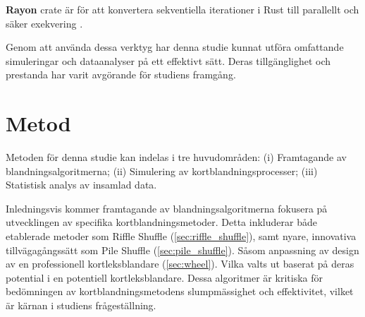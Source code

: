 \documentclass[swedish,a4paper]{article}
\begin{document}
\textbf{Rayon} \gls{crate}  är för att konvertera sekventiella 
iterationer i Rust till parallellt och säker exekvering 
\parencite{rayon_crate}.

Genom att använda dessa verktyg har denna studie kunnat utföra omfattande
simuleringar och dataanalyser på ett effektivt sätt. Deras tillgänglighet och
prestanda har varit avgörande för studiens framgång.




\section{Metod} 
Metoden för denna studie kan indelas i tre huvudområden:
(i) Framtagande av  blandningsalgoritmerna;
(ii) Simulering av kortblandningsprocesser;
(iii) Statistisk analys av insamlad data.

Inledningsvis kommer framtagande av blandningsalgoritmerna fokusera på
utvecklingen av specifika kortblandningsmetoder. Detta inkluderar både
etablerade metoder som Riffle Shuffle (\ref{sec:riffle_shuffle}), samt nyare,
innovativa tillvägagångssätt som Pile Shuffle (\ref{sec:pile_shuffle}). Såsom
anpassning av design av en professionell kortleksblandare (\ref{sec:wheel}).
Vilka valts ut baserat på deras potential i en potentiell kortleksblandare.
Dessa algoritmer är kritiska för bedömningen av kortblandningsmetodens
slumpmässighet och effektivitet, vilket är kärnan i studiens frågeställning. 
\end{document}
